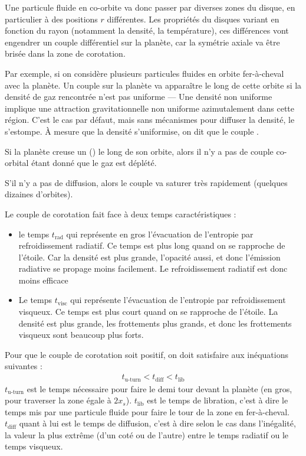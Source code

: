 Une particule fluide en co-orbite va donc passer par diverses zones du disque, en particulier à des positions $r$ différentes. Les propriétés du disques variant en fonction du rayon (notamment la densité, la température), ces différences vont engendrer un couple différentiel sur la planète, car la symétrie axiale va être brisée dans la zone de corotation. 



Par exemple, si on considère plusieurs particules fluides en orbite fer-à-cheval  avec la planète. Un couple sur la planète va apparaître le long de cette orbite si la densité de gaz rencontrée n'est pas uniforme --- Une densité non uniforme implique une attraction gravitationnelle non uniforme azimutalement dans cette région. C'est le cas par défaut, mais sans mécanismes pour diffuser la densité, le  s'estompe. À mesure que la densité s'uniformise, on dit que le couple  .

\begin{remarque}
Si la planète creuse un  () le long de son orbite, alors il n'y a pas de couple co-orbital étant donné que le gaz est déplété.

S'il n'y a pas de diffusion, alors le couple va saturer très rapidement (quelques dizaines d'orbites).
\end{remarque}

Le couple de corotation fait face à deux temps caractéristiques :
\begin{itemize}
\item le temps $t_\text{rad}$ qui représente en gros l'évacuation de l'entropie par refroidissement radiatif. Ce temps est plus long quand on se rapproche de l'étoile. Car la densité est plus grande, l'opacité aussi, et donc l'émission radiative se propage moins facilement. Le refroidissement radiatif est donc moins efficace
\item Le temps $t_\text{visc}$ qui représente l'évacuation de l'entropie par refroidissement visqueux. Ce temps est plus court quand on se rapproche de l'étoile. La densité est plus grande, les frottements plus grands, et donc les frottements visqueux sont beaucoup plus forts. 
\end{itemize}

Pour que le couple de corotation soit positif, on doit satisfaire aux inéquations suivantes :
\begin{align}
t_\text{u-turn} < t_\text{diff} < t_\text{lib}
\end{align}
$t_\text{u-turn}$ est le temps nécessaire pour faire le demi tour devant la planète (en gros, pour traverser la zone égale à $2x_s$). $t_\text{lib}$ est le temps de libration, c'est à dire le temps mis par une particule fluide pour faire le tour de la zone en fer-à-cheval. $t_\text{diff}$ quant à lui est le temps de diffusion, c'est à dire selon le cas dans l'inégalité, la valeur la plus extrême (d'un coté ou de l'autre) entre le temps radiatif ou le temps visqueux.

